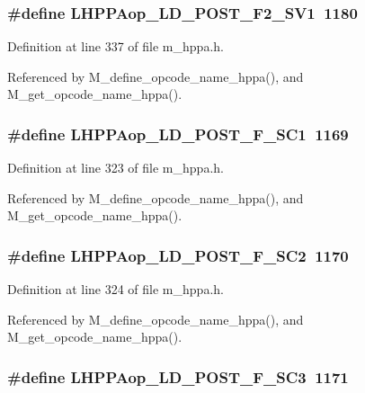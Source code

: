 \subsubsection{\setlength{\rightskip}{0pt plus 5cm}\#define LHPPAop\_\-LD\_\-POST\_\-F2\_\-SV1~1180}\label{m__hppa_8h_eec3bffe41c672f08644025d3ece2e5b}




Definition at line 337 of file m\_\-hppa.h.

Referenced by M\_\-define\_\-opcode\_\-name\_\-hppa(), and M\_\-get\_\-opcode\_\-name\_\-hppa().
\subsubsection{\setlength{\rightskip}{0pt plus 5cm}\#define LHPPAop\_\-LD\_\-POST\_\-F\_\-SC1~1169}\label{m__hppa_8h_079ef228e8c9a093f54b02c65658b9ff}




Definition at line 323 of file m\_\-hppa.h.

Referenced by M\_\-define\_\-opcode\_\-name\_\-hppa(), and M\_\-get\_\-opcode\_\-name\_\-hppa().
\subsubsection{\setlength{\rightskip}{0pt plus 5cm}\#define LHPPAop\_\-LD\_\-POST\_\-F\_\-SC2~1170}\label{m__hppa_8h_724699857f10d9a13db2945a95898cec}




Definition at line 324 of file m\_\-hppa.h.

Referenced by M\_\-define\_\-opcode\_\-name\_\-hppa(), and M\_\-get\_\-opcode\_\-name\_\-hppa().
\subsubsection{\setlength{\rightskip}{0pt plus 5cm}\#define LHPPAop\_\-LD\_\-POST\_\-F\_\-SC3~1171}\label{m__hppa_8h_535a81c22dcd8facdcb07cbc0d1263e8}




